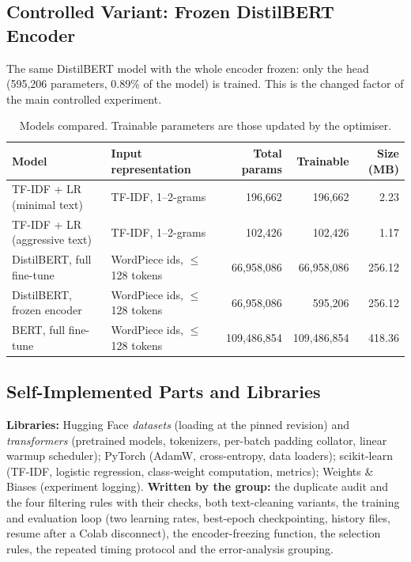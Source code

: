 \documentclass[11pt,a4paper]{article}
\begin{document}
\subsection{Controlled Variant: Frozen DistilBERT Encoder}
The same DistilBERT model with the whole encoder frozen: only the head (595,206 parameters, 0.89\% of the model) is trained. This is the changed factor of the main controlled experiment.

\begin{table}[H]
\centering
\caption{Models compared. Trainable parameters are those updated by the optimiser.}
\label{tab:models}
\begin{tabularx}{\textwidth}{@{}lLrrr@{}}
\toprule
\textbf{Model} & \textbf{Input representation} & \textbf{Total params} & \textbf{Trainable} & \textbf{Size (MB)}\\
\midrule
TF-IDF + LR (minimal text) & TF-IDF, 1--2-grams & 196,662 & 196,662 & 2.23\\
TF-IDF + LR (aggressive text) & TF-IDF, 1--2-grams & 102,426 & 102,426 & 1.17\\
DistilBERT, full fine-tune & WordPiece ids, $\le$128 tokens & 66,958,086 & 66,958,086 & 256.12\\
DistilBERT, frozen encoder & WordPiece ids, $\le$128 tokens & 66,958,086 & 595,206 & 256.12\\
BERT, full fine-tune & WordPiece ids, $\le$128 tokens & 109,486,854 & 109,486,854 & 418.36\\
\bottomrule
\end{tabularx}
\end{table}

\subsection{Self-Implemented Parts and Libraries}
\textbf{Libraries:} Hugging Face \emph{datasets} (loading at the pinned revision) and \emph{transformers} \cite{wolf2020} (pretrained models, tokenizers, per-batch padding collator, linear warmup scheduler); PyTorch \cite{paszke2019} (AdamW, cross-entropy, data loaders); scikit-learn \cite{pedregosa2011} (TF-IDF, logistic regression, class-weight computation, metrics); Weights \& Biases \cite{wandb} (experiment logging). \textbf{Written by the group:} the duplicate audit and the four filtering rules with their checks, both text-cleaning variants, the training and evaluation loop (two learning rates, best-epoch checkpointing, history files, resume after a Colab disconnect), the encoder-freezing function, the selection rules, the repeated timing protocol and the error-analysis grouping.
\end{document}
